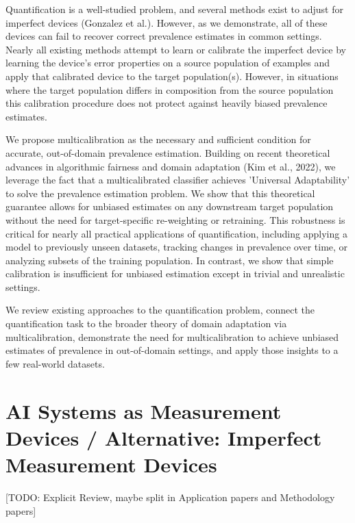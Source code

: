 \documentclass[12pt]{article}
\begin{document}
Quantification is a well-studied problem, and several methods exist to adjust for imperfect devices (Gonzalez et al.). However, as we demonstrate, all of these devices can fail to recover correct prevalence estimates in common settings. Nearly all existing methods attempt to learn or calibrate the imperfect device by learning the device’s error properties on a source population of examples and apply that calibrated device to the target population(s). However, in situations where the target population differs in composition from the source population this calibration procedure does not protect against heavily biased prevalence estimates.

We propose multicalibration as the necessary and sufficient condition for accurate, out-of-domain prevalence estimation. Building on recent theoretical advances in algorithmic fairness and domain adaptation (Kim et al., 2022), we leverage the fact that a multicalibrated classifier achieves 'Universal Adaptability' to solve the prevalence estimation problem. We show that this theoretical guarantee allows for unbiased estimates on any downstream target population without the need for target-specific re-weighting or retraining. This robustness is critical for nearly all practical applications of quantification, including applying a model to previously unseen datasets, tracking changes in prevalence over time, or analyzing subsets of the training population. In contrast, we show that simple calibration is insufficient for unbiased estimation except in trivial and unrealistic settings.

We review existing approaches to the quantification problem, connect the quantification task to the broader theory of domain adaptation via multicalibration, demonstrate the need for multicalibration to achieve unbiased estimates of prevalence in out-of-domain settings, and apply those insights to a few real-world datasets.


\section{AI Systems as Measurement Devices / Alternative: Imperfect Measurement Devices}

[TODO: Explicit Review, maybe split in Application papers and Methodology papers]

\end{document}
